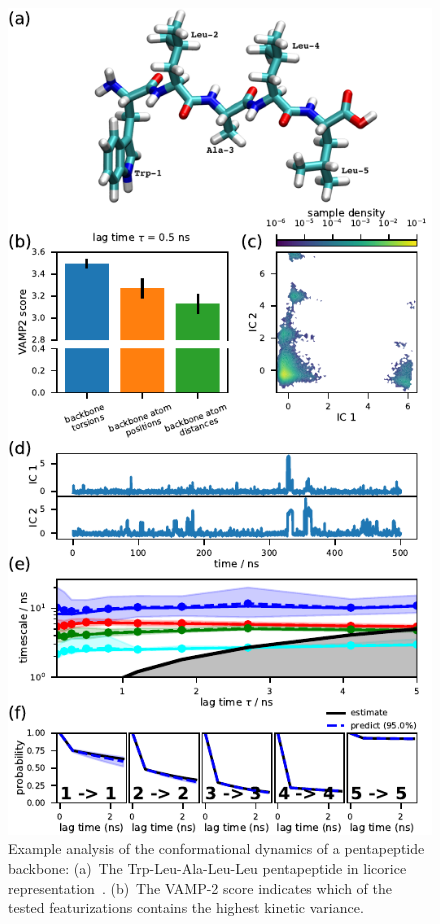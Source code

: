 \documentclass[9pt,tutorial]{livecoms}
\begin{document}
\begin{figure}
\includegraphics{figure_2}
\caption{Example analysis of the conformational dynamics of a pentapeptide backbone: (a)~The Trp-Leu-Ala-Leu-Leu pentapeptide in licorice representation~\cite{vmd}.
(b)~The VAMP-2 score indicates which of the tested featurizations contains the highest kinetic variance.
}
\end{figure}
\end{document}
